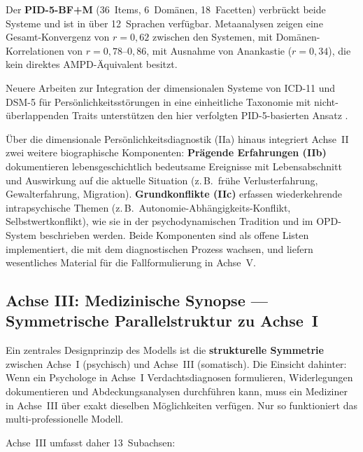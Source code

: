 \documentclass[11pt,a4paper]{article}
\begin{document}
Der \textbf{PID-5-BF+M} (36~Items, 6~Dom\"anen, 18~Facetten) verbr\"uckt beide Systeme und ist in \"uber 12~Sprachen verf\"ugbar. Metaanalysen zeigen eine Gesamt-Konvergenz von $r = 0{,}62$ zwischen den Systemen, mit Dom\"anen-Korrelationen von $r = 0{,}78$--$0{,}86$, mit Ausnahme von Anankastie ($r = 0{,}34$), die kein direktes AMPD-\"Aquivalent besitzt.

Neuere Arbeiten zur Integration der dimensionalen Systeme von ICD-11 und DSM-5 f\"ur Pers\"onlichkeitsst\"orungen in eine einheitliche Taxonomie mit nicht-\"uberlappenden Traits unterst\"utzen den hier verfolgten PID-5-basierten Ansatz \citep{Bach2022}.

\"Uber die dimensionale Pers\"onlichkeitsdiagnostik (IIa) hinaus integriert Achse~II zwei weitere biographische Komponenten: \textbf{Pr\"agende Erfahrungen (IIb)} dokumentieren lebensgeschichtlich bedeutsame Ereignisse mit Lebensabschnitt und Auswirkung auf die aktuelle Situation (z.\,B.\ fr\"uhe Verlusterfahrung, Gewalterfahrung, Migration). \textbf{Grundkonflikte (IIc)} erfassen wiederkehrende intrapsychische Themen (z.\,B.\ Autonomie-Abh\"angigkeits-Konflikt, Selbstwertkonflikt), wie sie in der psychodynamischen Tradition und im OPD-System beschrieben werden. Beide Komponenten sind als offene Listen implementiert, die mit dem diagnostischen Prozess wachsen, und liefern wesentliches Material f\"ur die Fallformulierung in Achse~V.

\subsection{Achse III: Medizinische Synopse --- Symmetrische Parallelstruktur zu Achse~I}
\label{sec:achse3}

Ein zentrales Designprinzip des Modells ist die \textbf{strukturelle Symmetrie} zwischen Achse~I (psychisch) und Achse~III (somatisch). Die Einsicht dahinter: Wenn ein Psychologe in Achse~I Verdachtsdiagnosen formulieren, Widerlegungen dokumentieren und Abdeckungsanalysen durchf\"uhren kann, muss ein Mediziner in Achse~III \"uber exakt dieselben M\"oglichkeiten verf\"ugen. Nur so funktioniert das multi-professionelle Modell.

Achse~III umfasst daher 13~Subachsen:
\end{document}
